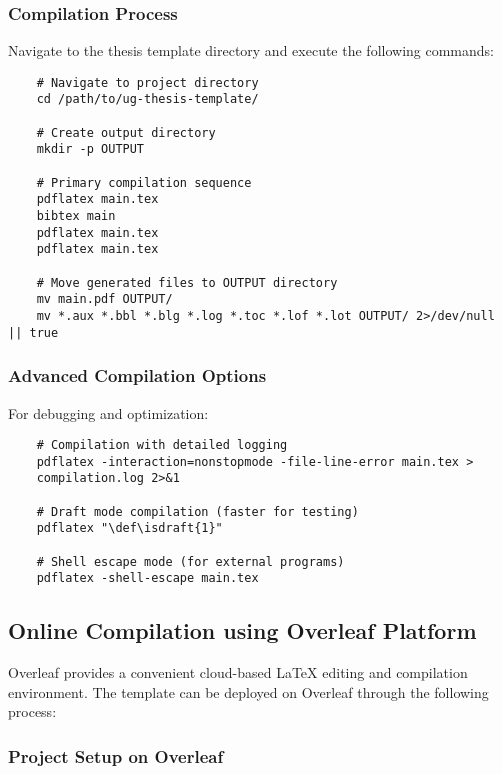 \subsubsection{Compilation Process}
\label{subsubsec:compilation_process}

Navigate to the thesis template directory and execute the following commands:

\begin{verbatim}
	# Navigate to project directory
	cd /path/to/ug-thesis-template/
	
	# Create output directory
	mkdir -p OUTPUT
	
	# Primary compilation sequence
	pdflatex main.tex
	bibtex main
	pdflatex main.tex
	pdflatex main.tex
	
	# Move generated files to OUTPUT directory
	mv main.pdf OUTPUT/
	mv *.aux *.bbl *.blg *.log *.toc *.lof *.lot OUTPUT/ 2>/dev/null || true
\end{verbatim}

\subsubsection{Advanced Compilation Options}
\label{subsubsec:advanced_compilation}

For debugging and optimization:

\begin{verbatim}
	# Compilation with detailed logging
	pdflatex -interaction=nonstopmode -file-line-error main.tex > 
	compilation.log 2>&1
	
	# Draft mode compilation (faster for testing)
	pdflatex "\def\isdraft{1}"
	
	# Shell escape mode (for external programs)
	pdflatex -shell-escape main.tex
\end{verbatim}

\subsection{Online Compilation using Overleaf Platform}
\label{subsec:online_compilation}

Overleaf provides a convenient cloud-based LaTeX editing and compilation environment. The template can be deployed on Overleaf through the following process:

\subsubsection{Project Setup on Overleaf}
\label{subsubsec:overleaf_setup}


